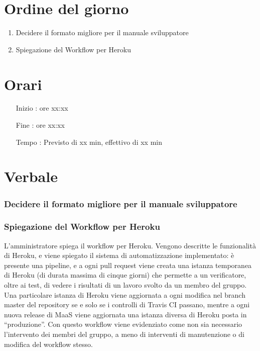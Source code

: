 \documentclass[11pt]{meetingmins}
\begin{document}
\maketitle

\section{Ordine del giorno}

\begin{enumerate}

\item Decidere il formato migliore per il manuale sviluppatore
\item Spiegazione del Workflow per Heroku
\end{enumerate}

\section{Orari}

\begin{itemize}
\item[Inizio]: ore xx:xx
\item[Fine]: ore xx:xx
\item[Tempo]: Previsto di xx min, effettivo di xx min

\end{itemize}

\section{Verbale}

\subsubsection{Decidere il formato migliore per il manuale sviluppatore}

\subsubsection{Spiegazione del Workflow per Heroku}
L'amministratore spiega il workflow per Heroku. Vengono descritte le funzionalità di Heroku, e viene spiegato il sistema di automatizzazione implementato: è presente una pipeline, e a ogni pull request viene creata una istanza temporanea di Heroku (di durata massima di cinque giorni) che permette a un verificatore, oltre ai test, di vedere i risultati di un lavoro svolto da un membro del gruppo.
Una particolare istanza di Heroku viene aggiornata a ogni modifica nel branch master del repository se e solo se i controlli di Travis CI passano, mentre a ogni nuova release di MaaS viene aggiornata una istanza diversa di Heroku posta in ``produzione''.
Con questo workflow viene evidenziato come non sia necessario l'intervento dei membri del gruppo, a meno di interventi di manutenzione o di modifica del workflow stesso.

\end{document}
